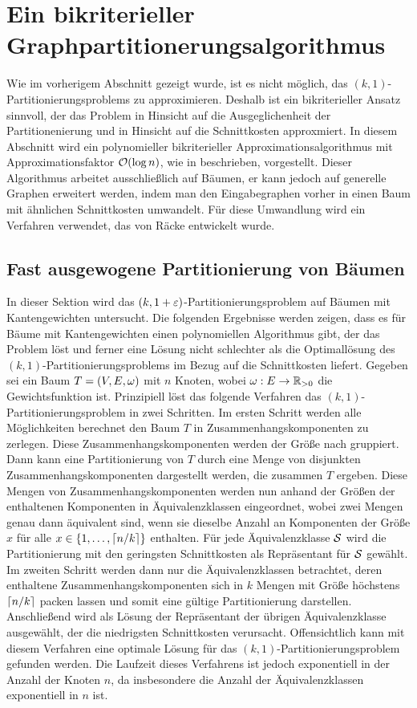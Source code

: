 \section{Ein bikriterieller Graphpartitionerungsalgorithmus}
Wie im vorherigem Abschnitt gezeigt wurde, ist es nicht möglich, das $(k,1)$\hyp Partitionierungsproblems zu approximieren. 
Deshalb ist ein bikriterieller Ansatz sinnvoll, der das Problem in Hinsicht auf die Ausgeglichenheit der Partitionenierung und in Hinsicht auf die Schnittkosten approxmiert.
In diesem Abschnitt wird ein polynomieller bikriterieller Approximationsalgorithmus mit Approximationsfaktor $\bigO(\log n)$, wie in \parencite{ff13} beschrieben, vorgestellt.
Dieser Algorithmus arbeitet ausschließlich auf Bäumen, er kann jedoch auf generelle Graphen erweitert werden, indem man den Eingabegraphen vorher in einen Baum mit ähnlichen Schnittkosten umwandelt.
Für diese Umwandlung wird ein Verfahren verwendet, das von Räcke entwickelt wurde. \parencite{rc08}

\subsection{Fast ausgewogene Partitionierung von Bäumen}\label{sec:treepartitioning}
In dieser Sektion wird das $(k,1+\eps)$\hyp Partitionierungsproblem auf Bäumen mit Kantengewichten untersucht. 
Die folgenden Ergebnisse werden zeigen, dass es für Bäume mit Kantengewichten einen polynomiellen Algorithmus gibt, der das Problem löst und ferner eine Lösung nicht schlechter als die Optimallösung des $(k,1)$\hyp Partitionierungsproblems im Bezug auf die Schnittkosten liefert.
Gegeben sei ein Baum $T = (V,E,\weight)$ mit $n$ Knoten, wobei $\weight : E \rightarrow \reals_{> 0}$ die Gewichtsfunktion ist.
Prinzipiell löst das folgende Verfahren das $(k,1)$\hyp Partitionierungsproblem in zwei Schritten.
Im ersten Schritt werden alle Möglichkeiten berechnet den Baum $T$ in Zusammenhangskomponenten zu zerlegen.
Diese Zusammenhangskomponenten werden der Größe nach gruppiert.
Dann kann eine Partitionierung von $T$ durch eine Menge von disjunkten Zusammenhangskomponenten dargestellt werden, die zusammen $T$ ergeben. 
Diese Mengen von Zusammenhangskomponenten werden nun anhand der Größen der enthaltenen Komponenten in Äquivalenzklassen eingeordnet, wobei zwei Mengen genau dann äquivalent sind, wenn sie dieselbe Anzahl an Komponenten der Größe $x$ für alle $x \in \{1, \ldots, \ceil*{n/k}\}$ enthalten.
Für jede Äquivalenzklasse $\calS$ wird die Partitionierung mit den geringsten Schnittkosten als Repräsentant für $\calS$ gewählt.
Im zweiten Schritt werden dann nur die Äquivalenzklassen betrachtet, deren enthaltene Zusammenhangskomponenten sich in $k$ Mengen mit Größe höchstens $\ceil*{n/k}$ packen lassen und somit eine gültige Partitionierung darstellen.
Anschließend wird als Lösung der Repräsentant der übrigen Äquivalenzklasse ausgewählt, der die niedrigsten Schnittkosten verursacht.
Offensichtlich kann mit diesem Verfahren eine optimale Lösung für das $(k,1)$\hyp Partitionierungsproblem gefunden werden.
Die Laufzeit dieses Verfahrens ist jedoch exponentiell in der Anzahl der Knoten $n$, da insbesondere die Anzahl der Äquivalenzklassen exponentiell in $n$ ist.

